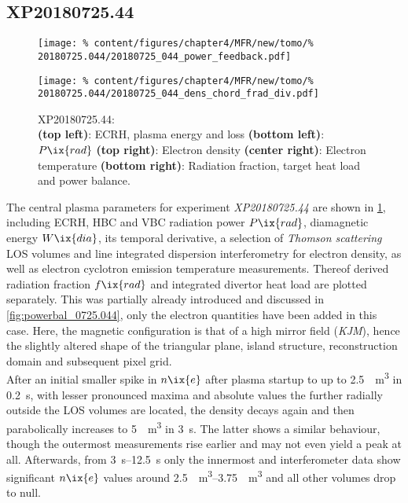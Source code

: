         \subsection*{XP20180725.44}%
%
            \begin{figure}[t]%
                \centering%
                \captionsetup{width=.47\textwidth}%
                \begin{minipage}[c]{0.47\textwidth}%
                    \centering%
                    \texttt{[image: \%
                        content/figures/chapter4/MFR/new/tomo/\%
                        20180725.044/20180725\_044\_power\_feedback.pdf]}%
                    \caption{%
                        XP20180725.44:\\%
                        \textbf{(top left)}: ECRH, plasma energy and loss \textbf{(bottom left)}: $P\ix{rad}$ \textbf{(top right)}: Electron density \textbf{(center right)}: Electron temperature \textbf{(bottom right)}: Radiation fraction, target heat load and power balance.}\label{fig:20180725.44_PDF}%
                \end{minipage}%
                \hfill%
                \begin{minipage}[c]{0.47\textwidth}%
                    \centering%
                    \texttt{[image: \%
                        content/figures/chapter4/MFR/new/tomo/\%
                        20180725.044/20180725\_044\_dens\_chord\_frad\_div.pdf]}%
                \end{minipage}%
            \end{figure}%
%
            The central plasma parameters for experiment \textit{XP20180725.44} are shown in \cref{fig:20180725.44_PDF}, including ECRH, HBC and VBC radiation power $P\ix{rad}$, diamagnetic energy $W\ix{dia}$, its temporal derivative, a selection of \textit{Thomson scattering} LOS volumes and line integrated dispersion interferometry for electron density, as well as electron cyclotron emission temperature measurements. Thereof derived radiation fraction $f\ix{rad}$ and integrated divertor heat load are plotted separately. This was partially already introduced and discussed in \cref{fig:powerbal_0725.044}, only the electron quantities have been added in this case. Here, the magnetic configuration is that of a high mirror field (\textit{KJM}), hence the slightly altered shape of the triangular plane, island structure, reconstruction domain and subsequent pixel grid.\\%
            After an initial smaller spike in $n\ix{e}$ after plasma startup to up to \SI{2.5}{\per\cubic\meter} in \SI{0.2}{\second}, with lesser pronounced maxima and absolute values the further radially outside the LOS volumes are located, the density decays again and then parabolically increases to \SI{5}{\per\cubic\meter} in \SI{3}{\second}. The latter shows a similar behaviour, though the outermost measurements rise earlier and may not even yield a peak at all. Afterwards, from \SIrange{3}{12.5}{\second} only the innermost and interferometer data show significant $n\ix{e}$ values around \SIrange{2.5}{3.75}{\per\cubic\meter} and all other volumes drop to null.\\%
